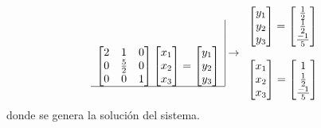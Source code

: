 \documentclass[11pt]{article}
\begin{document}
\begin{enumerate}
$$\begin{array}{c|}
    \\ \\
    \begin{bmatrix}
    2 & 1 & 0 \\ 
    0 & \frac{5}{2} & 0\\
    0 & 0 & 1
   	\end{bmatrix}
        \begin{bmatrix} x_1\\x_2\\x_3 	\end{bmatrix}
        =
        \begin{bmatrix} y_1\\y_2\\y_3 	\end{bmatrix}
        \\
        \hline
\end{array}
\rightarrow 
\begin{array}{c}
\begin{bmatrix} y_1\\y_2\\y_3 	\end{bmatrix}
=
\begin{bmatrix} \frac{1}{2} \\ \frac{1}{2} \\ \frac{-1}{5} 	\end{bmatrix} 	\\
																			\\
\begin{bmatrix} x_1\\x_2\\x_3 	\end{bmatrix}
=
\begin{bmatrix} 1 \\ \frac{1}{2} \\ \frac{-1}{5} 	\end{bmatrix} \\

\end{array}
$$
donde se genera la soluci\'on del sistema. \fbox{5 pt}


\end{enumerate}
\end{document}
